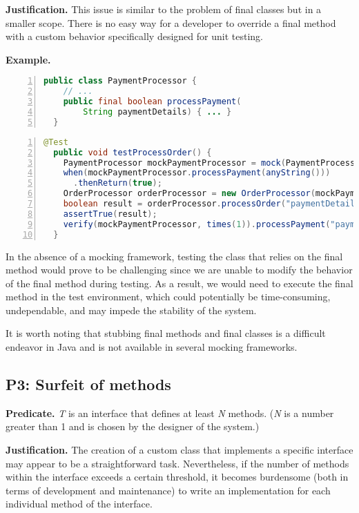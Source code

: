 \documentclass[conference]{IEEEtran}
\begin{document}
\textbf{Justification. }
This issue is similar to the problem of final classes but in a smaller scope. There is no easy way for a developer to override a final method with a custom behavior specifically designed for unit testing. 

\textbf{Example. }
\begin{lstlisting}[basicstyle=\ttfamily,
numbers=left,numbersep=0pt,basicstyle=\scriptsize\ttfamily,language = Java, framesep=4.5mm, framexleftmargin=1.0mm, captionpos=b, escapechar=|, morekeywords={@Test}]
  public class PaymentProcessor {
    // ...
    public final boolean processPayment(
        String paymentDetails) { ... }
  }
\end{lstlisting}

\begin{lstlisting}[basicstyle=\ttfamily,
numbers=left,numbersep=0pt,basicstyle=\scriptsize\ttfamily,language = Java, framesep=4.5mm, framexleftmargin=1.0mm, captionpos=b, escapechar=|, morekeywords={@Test}]
  @Test
  public void testProcessOrder() {
    PaymentProcessor mockPaymentProcessor = mock(PaymentProcessor.class);
    when(mockPaymentProcessor.processPayment(anyString()))
      .thenReturn(true);
    OrderProcessor orderProcessor = new OrderProcessor(mockPaymentProcessor);
    boolean result = orderProcessor.processOrder("paymentDetails");
    assertTrue(result);
    verify(mockPaymentProcessor, times(1)).processPayment("paymentDetails");
  }
\end{lstlisting}

In the absence of a mocking framework, testing the class that relies on the final method would prove to be challenging since we are unable to modify the behavior of the final method during testing. As a result, we would need to execute the final method in the test environment, which could potentially be time-consuming, undependable, and may impede the stability of the system.

It is worth noting that stubbing final methods and final classes is a difficult endeavor in Java and is not available in several mocking frameworks.


\subsection{P3: Surfeit of methods}
\textbf{Predicate. }
\textit{T} is an interface that defines at least \textit{N} methods. (\textit{N} is a number greater than 1 and is chosen by the designer of the system.)

\textbf{Justification. }
The creation of a custom class that implements a specific interface may appear to be a straightforward task. Nevertheless, if the number of methods within the interface exceeds a certain threshold, it becomes burdensome (both in terms of development and maintenance) to write an implementation for each individual method of the interface.
\end{document}
